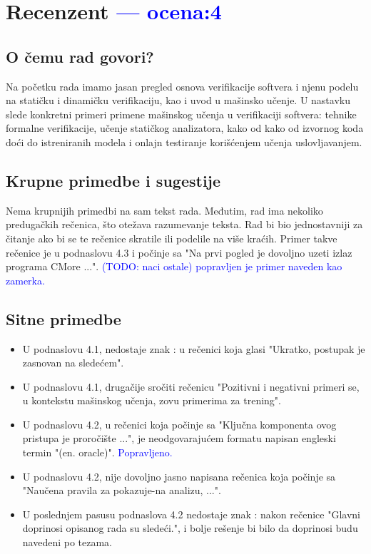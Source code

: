 \documentclass[a4paper]{report}
\newcommand{\odgovor}[1]{\textcolor{blue}{#1}}
\begin{document}
\chapter{Recenzent \odgovor{--- ocena:4} }


\section{O čemu rad govori?}

Na početku rada imamo jasan pregled osnova verifikacije softvera i njenu podelu na statičku i dinamičku verifikaciju, kao i uvod u mašinsko učenje. U nastavku slede konkretni primeri primene mašinskog učenja u verifikaciji softvera: tehnike formalne verifikacije, učenje statičkog analizatora, kako od kako od izvornog koda doći do istreniranih modela i onlajn testiranje korišćenjem učenja u\-slo\-vlja\-va\-njem.

\section{Krupne primedbe i sugestije}

Nema krupnijih primedbi na sam tekst rada. Međutim, rad ima nekoliko pre\-du\-ga\-čkih rečenica, što otežava razumevanje teksta. Rad bi bio jednostavniji za čitanje ako bi se te rečenice skratile ili podelile na više kraćih. Primer takve rečenice je u podnaslovu 4.3 i počinje sa "Na prvi pogled je dovoljno uzeti izlaz programa CMore ...".
\odgovor{(TODO: naci ostale) popravljen je primer naveden kao zamerka.}

\section{Sitne primedbe}

\begin{itemize}
	\item U podnaslovu 4.1, nedostaje znak : u rečenici koja glasi "Ukratko, postupak je zasnovan na sledećem".
    \item U podnaslovu 4.1, drugačije sročiti rečenicu "Pozitivni i negativni primeri se, u kontekstu mašinskog učenja, zovu primerima za trening".
    \item U podnaslovu 4.2, u rečenici koja počinje sa "Ključna komponenta ovog pristupa je proročište ...", je neodgovarajućem formatu napisan engleski termin "(en. oracle)".
    \odgovor{Popravljeno.}
    \item U podnaslovu 4.2, nije dovoljno jasno napisana rečenica koja počinje sa "Naučena pravila za pokazuje-na analizu, ...".
    \item U poslednjem pasusu podnaslova 4.2 nedostaje znak : nakon rečenice "Glavni doprinosi opisanog rada su sledeći.", i bolje rešenje bi bilo da doprinosi budu navedeni po tezama.
\end{itemize}
\end{document}
